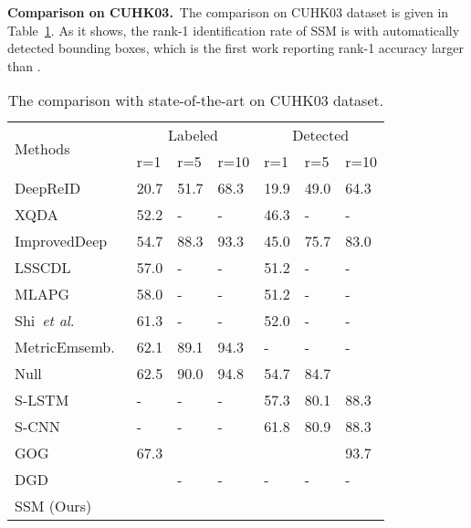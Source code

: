 \documentclass[10pt,twocolumn,letterpaper]{article}
\def\etal{\emph{et al}.}
\begin{document}
\vspace{1ex}\noindent\textbf{Comparison on CUHK03.}~The comparison on CUHK03 dataset is given in Table~\ref{table:CUHK03_art}. As it shows, the rank-1 identification rate of SSM is  with automatically detected bounding boxes, which is the first work reporting rank-1 accuracy larger than .
\begin{table}[tb]
\small
\centering
\begin{tabular}{|l|*{3}{p{0.44cm}<{\centering}}|*{3}{p{0.44cm}<{\centering}}|}
\hline
\multirow{2}{*}{Methods}   & \multicolumn{3}{c|}{Labeled} & \multicolumn{3}{c|}{Detected}\\
\cline{2-7}
          & r=1 & r=5 & r=10  & r=1 & r=5 & r=10      \\
\hline
\hline
DeepReID~\cite{Deepreid} & 20.7 & 51.7 & 68.3 & 19.9 & 49.0 & 64.3 \\
XQDA~\cite{XQDA} & 52.2 & - & - & 46.3 & - & - \\
ImprovedDeep~\cite{ImprovedDeep} & 54.7 & 88.3 & 93.3 & 45.0 & 75.7 & 83.0 \\
LSSCDL~\cite{LSSCDL} & 57.0	& - & - &	51.2 & - & - \\
MLAPG~\cite{MLAPG} & 58.0 & - & - & 51.2 & - & - \\
Shi~\etal~\cite{shi2016embedding} & 61.3	& - & -	& 52.0 & - & - \\
MetricEmsemb.~\cite{MetricEmsemble} & 62.1 & 89.1 & 94.3 & - & - & -\\
Null~\cite{null} & 62.5 & 90.0 & 94.8 &	54.7 &	84.7 &	\textbf{\color{blue}{94.8}} \\
S-LSTM~\cite{S-LSTM} & - & - & - & 57.3 & 80.1 & 88.3 \\
S-CNN~\cite{S-CNN} & - & - & - & 61.8 & 80.9 & 88.3 \\
GOG~\cite{GOG} & 67.3 & \textbf{\color{blue}{91.0}} & \textbf{\color{blue}{96.0}} & \textbf{\color{blue}{65.5}} & \textbf{\color{blue}{88.4}} & 93.7 \\
DGD~\cite{DGD} & \textbf{\color{blue}{75.3}} & - & - & - & - & - \\
\hline
\hline
SSM (Ours) & \textbf{\color{red}{76.6}} & \textbf{\color{red}{94.6}} & \textbf{\color{red}{98.0}} & \textbf{\color{red}{72.7}} & \textbf{\color{red}{92.4}} & \textbf{\color{red}{96.1}}\\
\hline
\end{tabular}
\caption{The comparison with state-of-the-art on CUHK03 dataset.}
\label{table:CUHK03_art}
\vspace{-1ex}
\end{table}
\end{document}
